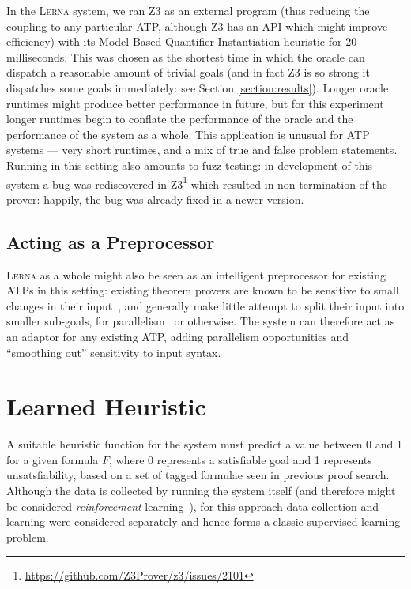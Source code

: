 \documentclass[runningheads]{llncs}
\newcommand{\lerna}{\textsc{Lerna}}
\newcommand{\z}[1]{\textsc{Z3}}
\begin{document}
In the \lerna{} system, we ran \z3{} as an external program (thus reducing the coupling to any particular ATP, although \z3{} has an API which might improve efficiency) with its Model-Based Quantifier Instantiation heuristic for 20 milliseconds.
This was chosen as the shortest time in which the oracle can dispatch a reasonable amount of trivial goals (and in fact \z3{} is so strong it dispatches some goals immediately: see Section \ref{section:results}).
Longer oracle runtimes might produce better performance in future, but for this experiment longer runtimes begin to conflate the performance of the oracle and the performance of the system as a whole.
This application is unusual for ATP systems --- very short runtimes, and a mix of true and false problem statements.
Running in this setting also amounts to fuzz-testing: in development of this system a bug was rediscovered in \z3{}\footnote{\url{https://github.com/Z3Prover/z3/issues/2101}} which resulted in non-termination of the prover: happily, the bug was already fixed in a newer version.

\subsection{Acting as a Preprocessor}
\lerna{} as a whole might also be seen as an intelligent preprocessor for existing ATPs in this setting: existing theorem provers are known to be sensitive to small changes in their input~\cite{clausification}, and generally make little attempt to split their input into smaller sub-goals, for parallelism~\cite{parallel} or otherwise.
The system can therefore act as an adaptor for any existing ATP, adding parallelism opportunities and ``smoothing out'' sensitivity to input syntax.

\section{Learned Heuristic}
\label{section:heuristic}
A suitable heuristic function for the system must predict a value between 0 and 1 for a given formula \(F\), where 0 represents a satisfiable goal and 1 represents unsatsfiability, based on a set of tagged formulae seen in previous proof search.
Although the data is collected by running the system itself (and therefore might be considered \emph{reinforcement} learning~\cite{reinforcement}), for this approach data collection and learning were considered separately and hence forms a classic supervised-learning problem.
\end{document}
